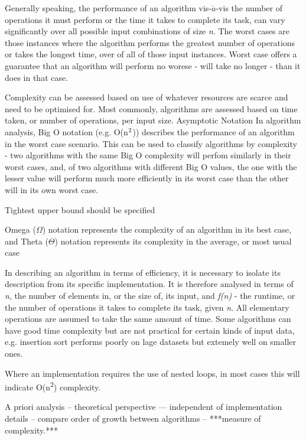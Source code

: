 \documentclass[12pt, a4paper]{article}
\begin{document}
Generally speaking, the performance of an algorithm vis-$\acute{a}$-vis the number of operations it must perform or the time it takes to complete its task, can vary significantly over all possible input combinations of size \emph{n}. The worst cases are those instances where the algorithm performs the greatest number of operations or takes the longest time, over of all of those input instances. Worst case offers a guarantee that an algorithm will perform no worese - will take no longer - than it does in that case. 


Complexity can be assessed based on use of whatever resources are scarce and need to be optimised for. Most commonly, algorithms are assessed based on time taken, or number of operations, per input size. 
Asymptotic Notation
In algorithm analysis, Big O notation (e.g. O(n$\textsuperscript{2}$)) describes the performance of an algorithm in the worst case scenario. This can be used to classify algorithms by complexity - two algorithms with the same Big O complexity will perfom similarly in their worst cases, and, of two algorithms with different Big O values, the one with the lesser value will perform much more efficiently in its worst case than the other will in its own worst case.

Tightest upper bound should be specified

Omega ($\Omega$) notation represents the complexity of an algorithm in its best case, and Theta ($\Theta$) notation represents its complexity in the average, or most usual case

In describing an algorithm in terms of efficiency, it is necessary to isolate its description from its specific implementation. It is therefore analysed in terms of \emph{n}, the number of elements in, or the size of, its input, and \emph{f(n)} - the runtime, or the number of operations it takes to complete its task, given \emph{n}. All elementary operations are assumed to take the same amount of time.
Some algorithms can have good time complexity but are not practical for certain kinds of input data, e.g. insertion sort performs poorly on lage datasets but extemely well on smaller ones.

Where an implementation requires the use of nested loops, in most cases this will indicate O(n\textsuperscript{2}) complexity.

A priori analysis -- theoretical perspective --- independent of implementation details -- compare order of growth between algorithms -- ***measure of complexity.***
\end{document}

